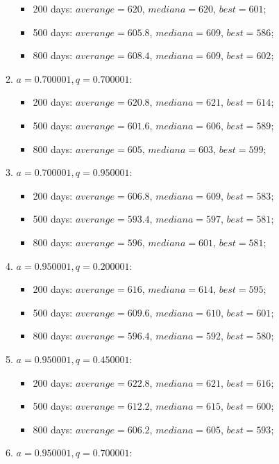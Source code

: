 \begin{enumerate}
\begin{enumerate}
		\begin{itemize}
			\item 200 days: $averange =  620$, $mediana =  620$, $best = 601$;
			\item 500 days: $averange =  605.8$, $mediana =  609$, $best = 586$;
			\item 800 days: $averange =  608.4$, $mediana =  609$, $best = 602$;
		\end{itemize}
		\item $a= 0.700001, q= 0.700001$:
		\begin{itemize}
			\item 200 days: $averange =  620.8$, $mediana =  621$, $best = 614$;
			\item 500 days: $averange =  601.6$, $mediana =  606$, $best = 589$;
			\item 800 days: $averange =  605$, $mediana =  603$, $best = 599$;
		\end{itemize}
		\item $a= 0.700001, q= 0.950001$:
		\begin{itemize}
			\item 200 days: $averange =  606.8$, $mediana =  609$, $best = 583$;
			\item 500 days: $averange =  593.4$, $mediana =  597$, $best = 581$;
			\item 800 days: $averange =  596$, $mediana =  601$, $best = 581$;
		\end{itemize}
		\item $a= 0.950001, q= 0.200001$:
		\begin{itemize}
			\item 200 days: $averange =  616$, $mediana =  614$, $best = 595$;
			\item 500 days: $averange =  609.6$, $mediana =  610$, $best = 601$;
			\item 800 days: $averange =  596.4$, $mediana =  592$, $best = 580$;
		\end{itemize}
		\item $a= 0.950001, q= 0.450001$:
		\begin{itemize}
			\item 200 days: $averange =  622.8$, $mediana =  621$, $best = 616$;
			\item 500 days: $averange =  612.2$, $mediana =  615$, $best = 600$;
			\item 800 days: $averange =  606.2$, $mediana =  605$, $best = 593$;
		\end{itemize}
		\item $a= 0.950001, q= 0.700001$:

\end{enumerate}
\end{enumerate}
